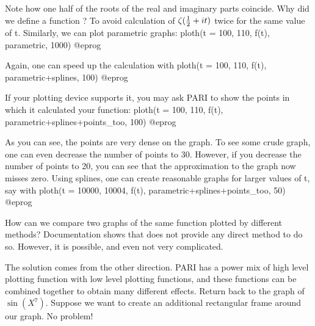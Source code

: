 Note how one half of the roots of the real and imaginary parts coincide.
Why did we define a function ?  To avoid calculation of
$\zeta({1\over2} + it)$ twice for the same value of t.  Similarly, we can
plot parametric graphs:
\bprog
  ploth(t = 100, 110, f(t), parametric, 1000)
@eprog

Again, one can speed up the calculation with
\bprog
  ploth(t = 100, 110, f(t), parametric+splines, 100)
@eprog

If your plotting device supports it, you may ask PARI to show the points
in which it calculated your function:
\bprog
  ploth(t = 100, 110, f(t), parametric+splines+points_too, 100)
@eprog

As you can see, the points are very dense on the graph.  To see some crude
graph, one can even decrease the number of points to 30.  However, if you
decrease the number of points to 20, you can see that the approximation to
the graph now misses zero.  Using splines, one can create reasonable graphs
for larger values of t, say with
\bprog
  ploth(t = 10000, 10004, f(t), parametric+splines+points_too, 50)
@eprog

How can we compare two graphs of the same function plotted by different
methods?  Documentation shows that  does not provide any direct
method to do so.  However, it is possible, and even not very complicated.

The solution comes from the other direction.  PARI has a power mix of high
level plotting function with low level plotting functions, and these functions
can be combined together to obtain many different effects.  Return back
to the graph of $\sin(X^7)$.  Suppose we want to create an additional
rectangular frame around our graph.  No problem!

